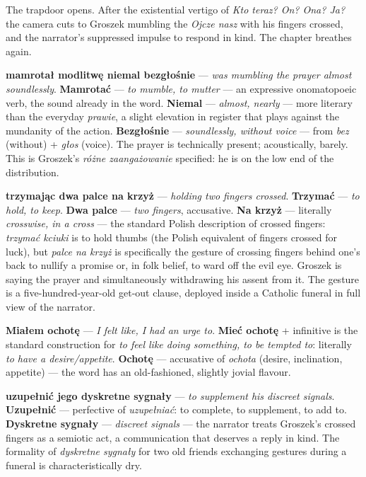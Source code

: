 The trapdoor opens. After the existential vertigo of
\textit{Kto teraz? On? Ona? Ja?} the camera cuts to
Groszek mumbling the \textit{Ojcze nasz} with his
fingers crossed, and the narrator's suppressed impulse
to respond in kind. The chapter breathes again.

\textbf{mamrotał modlitwę niemal bezgłośnie} ---
\textit{was mumbling the prayer almost soundlessly}.
\textbf{Mamrotać} --- \textit{to mumble, to mutter} ---
an expressive onomatopoeic verb, the sound already in
the word. \textbf{Niemal} --- \textit{almost, nearly}
--- more literary than the everyday \textit{prawie},
a slight elevation in register that plays against the
mundanity of the action. \textbf{Bezgłośnie} ---
\textit{soundlessly, without voice} --- from
\textit{bez} (without) + \textit{głos} (voice). The
prayer is technically present; acoustically, barely.
This is Groszek's \textit{różne zaangażowanie}
specified: he is on the low end of the distribution.

\textbf{trzymając dwa palce na krzyż} --- \textit{holding
two fingers crossed}. \textbf{Trzymać} ---
\textit{to hold, to keep}. \textbf{Dwa palce} ---
\textit{two fingers}, accusative. \textbf{Na krzyż}
--- literally \textit{crosswise, in a cross} ---
the standard Polish description of crossed fingers:
\textit{trzymać kciuki} is to hold thumbs (the Polish
equivalent of fingers crossed for luck), but
\textit{palce na krzyż} is specifically the
gesture of crossing fingers behind one's back to
nullify a promise or, in folk belief, to ward off
the evil eye. Groszek is saying the prayer and
simultaneously withdrawing his assent from it. The
gesture is a five-hundred-year-old get-out clause,
deployed inside a Catholic funeral in full view
of the narrator.

\textbf{Miałem ochotę} --- \textit{I felt like, I had
an urge to}. \textbf{Mieć ochotę} + infinitive is
the standard construction for \textit{to feel like
doing something, to be tempted to}: literally
\textit{to have a desire/appetite}. \textbf{Ochotę}
--- accusative of \textit{ochota} (desire, inclination,
appetite) --- the word has an old-fashioned, slightly
jovial flavour.

\textbf{uzupełnić jego dyskretne sygnały} ---
\textit{to supplement his discreet signals}.
\textbf{Uzupełnić} --- perfective of \textit{uzupełniać}:
to complete, to supplement, to add to. \textbf{Dyskretne
sygnały} --- \textit{discreet signals} --- the narrator
treats Groszek's crossed fingers as a semiotic act,
a communication that deserves a reply in kind.
The formality of \textit{dyskretne sygnały} for
two old friends exchanging gestures during a
funeral is characteristically dry.

